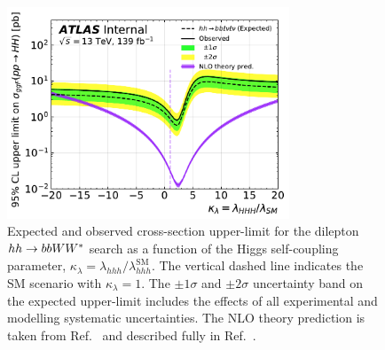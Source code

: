\begin{figure}[!htb]
    \begin{center}
        \includegraphics[width=0.75\textwidth]{figures/search_hh/results/wwbb_lambda_scan_may7}
        \caption{
            Expected and observed cross-section upper-limit for the dilepton $hh \rightarrow bbWW^*$ search
            as a function of the Higgs self-coupling parameter, $\kappa_{\lambda} = \lambda_{hhh} / \lambda_{hhh}^{\text{SM}}$.
            The vertical dashed line indicates the SM scenario with $\kappa_{\lambda} = 1$.
            The $\pm 1\sigma$ and $\pm 2 \sigma$ uncertainty band on the expected upper-limit includes the effects
            of all experimental and modelling systematic uncertainties.
            The NLO theory prediction is taken from Ref.~\cite{deFlorian:2016spz} and described fully
            in Ref.~\cite{HHComb36}.
        }
        \label{fig:hh_lambda_scan}
    \end{center}
\end{figure}


